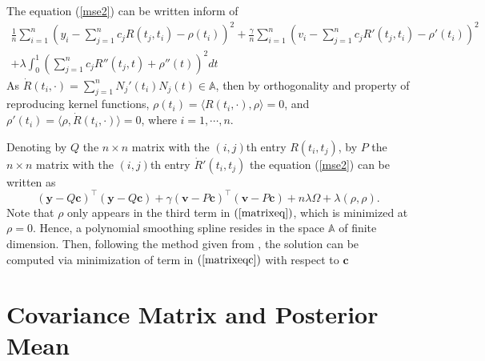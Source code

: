 The equation (\ref{mse2}) can be written inform of
\begin{equation}
\begin{split}
\frac{1}{n}\sum_{i=1}^n (y_i -\sum_{j=1}^{n}c_jR(t_j,t_i) -\rho(t_i))^2+
\frac{\gamma}{n}\sum_{i=1}^n (v_i -\sum_{j=1}^{n}c_jR'(t_j,t_i) -\rho'(t_i))^2 \\
+\lambda \int_{0}^{1} (\sum_{j=1}^{n}c_jR''(t_j,t)+\rho''(t))^2dt
\end{split}
\end{equation}
As $\dot{R}(t_i,\cdot) = \sum_{j=1}^{n}N_j'(t_i)N_j(t) \in \mathbb{A}$, then by orthogonality and property of reproducing kernel functions, $\rho(t_i)=\langle R(t_i,\cdot),\rho\rangle=0$, %
and $\rho'(t_i)=\langle \rho,\dot{R}(t_i,\cdot)\rangle=0$, where $i=1,\cdots,n$. 

Denoting by $Q$ the $n \times n$ matrix with the $(i,j)$th entry $R(t_i,t_j)$, by $P$ the $n \times n$ matrix with the $(i,j)$th entry $\dot{R}'(t_i,t_j)$ the equation (\ref{mse2}) can be written as
\begin{equation}\label{matrixeqc}
(\mathbf{y}-Q\mathbf{c})^\top(\mathbf{y}-Q\mathbf{c})+\gamma (\mathbf{v}-P\mathbf{c})^\top(\mathbf{v}- P\mathbf{c})+n\lambda \Omega+\lambda(\rho,\rho).
\end{equation}
Note that $\rho$ only appears in the third term in $(\ref{matrixeq})$, which is minimized at $\rho=0$. Hence, a polynomial smoothing spline resides in the space $\mathbb{A} $ of finite dimension. Then, following the method given from \cite{gubook}, the solution can be computed via minimization of term in $(\ref{matrixeqc})$ with respect to $\mathbf{c}$

\section{Covariance Matrix and Posterior Mean}\label{secmatrixandmean}

